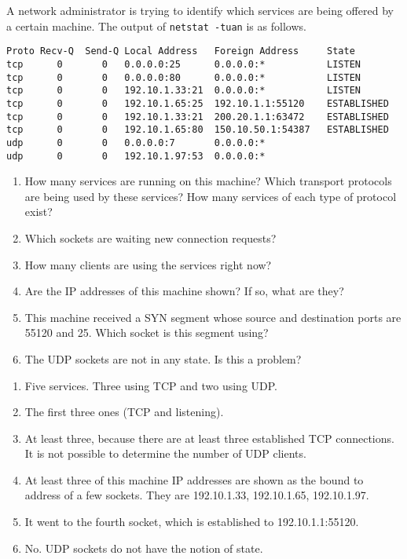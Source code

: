 \begin{Exercise}
A network administrator is trying to identify which services are being offered by a certain machine. The output of \texttt{netstat -tuan} is as follows.

\begin{verbatim}
Proto Recv-Q  Send-Q Local Address   Foreign Address     State
tcp      0       0   0.0.0.0:25      0.0.0.0:*           LISTEN
tcp      0       0   0.0.0.0:80      0.0.0.0:*           LISTEN
tcp      0       0   192.10.1.33:21  0.0.0.0:*           LISTEN
tcp      0       0   192.10.1.65:25  192.10.1.1:55120    ESTABLISHED
tcp      0       0   192.10.1.33:21  200.20.1.1:63472    ESTABLISHED
tcp      0       0   192.10.1.65:80  150.10.50.1:54387   ESTABLISHED
udp      0       0   0.0.0.0:7       0.0.0.0:*
udp      0       0   192.10.1.97:53  0.0.0.0:*
\end{verbatim}

\begin{enumerate}
\item How many services are running on this machine?
Which transport protocols are being used by these services?
How many services of each type of protocol exist?
\item Which sockets are waiting new connection requests?
\item How many clients are using the services right now?
\item Are the IP addresses of this machine shown? If so, what are they?
\item This machine received a SYN segment whose source and destination ports are 55120 and 25. Which socket is this segment using?
\item The UDP sockets are not in any state. Is this a problem?
\end{enumerate}
\end{Exercise}
\begin{Answer}
\begin{enumerate}
\item Five services. Three using TCP and two using UDP.
\item The first three ones (TCP and listening).
\item At least three, because there are at least three established TCP connections. It is not possible to determine the number of UDP clients.
\item At least three of this machine IP addresses are shown as the bound to address of a few sockets. They are 192.10.1.33, 192.10.1.65, 192.10.1.97.
\item It went to the fourth socket, which is established to 192.10.1.1:55120.
\item No. UDP sockets do not have the notion of state.
\end{enumerate}
\end{Answer}


